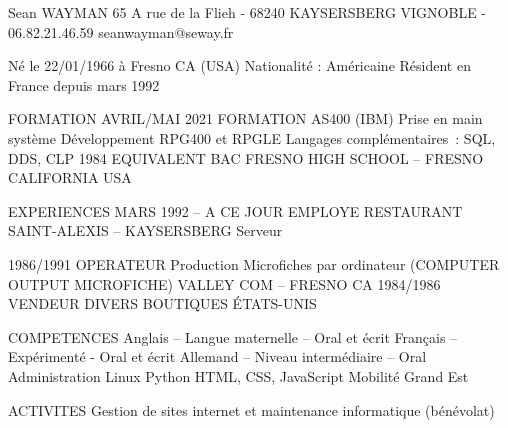\documentclass{article}
\begin{document}
\begin{block}
Sean WAYMAN
65 A rue de la Flieh       -       68240 KAYSERSBERG VIGNOBLE        -        06.82.21.46.59
seanwayman@seway.fr

Né le 22/01/1966 à Fresno CA (USA)
Nationalité : Américaine
Résident en France depuis mars 1992

FORMATION
AVRIL/MAI 2021
FORMATION AS400 (IBM)
Prise en main système
Développement RPG400 et RPGLE
Langages complémentaires : SQL, DDS, CLP
1984
EQUIVALENT BAC 
FRESNO HIGH SCHOOL – FRESNO CALIFORNIA
USA

EXPERIENCES
MARS 1992 – A CE JOUR
EMPLOYE
RESTAURANT SAINT-ALEXIS – KAYSERSBERG
Serveur

1986/1991
OPERATEUR
Production Microfiches par ordinateur 
(COMPUTER OUTPUT MICROFICHE) 
VALLEY COM – FRESNO CA
1984/1986
VENDEUR 
DIVERS BOUTIQUES
ÉTATS-UNIS







COMPETENCES
Anglais – Langue maternelle – Oral et écrit
Français – Expérimenté - Oral et écrit
Allemand – Niveau intermédiaire – Oral
Administration Linux	
Python
HTML, CSS, JavaScript
Mobilité Grand Est

ACTIVITES
Gestion de sites internet et maintenance informatique (bénévolat)

\end{block}
\end{document}
